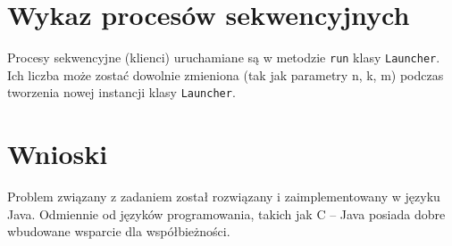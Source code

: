 \documentclass[titlepage]{article}
\begin{document}
\section{Wykaz procesów sekwencyjnych}
Procesy sekwencyjne (klienci) uruchamiane są w metodzie \texttt{run} klasy \texttt{Launcher}.
Ich liczba może zostać dowolnie zmieniona (tak jak parametry n, k, m) podczas tworzenia nowej instancji klasy \texttt{Launcher}.

\section{Wnioski}
Problem związany z zadaniem został rozwiązany i zaimplementowany w języku Java.
Odmiennie od języków programowania, takich jak C -- Java posiada dobre wbudowane wsparcie dla współbieżności.
\end{document}
